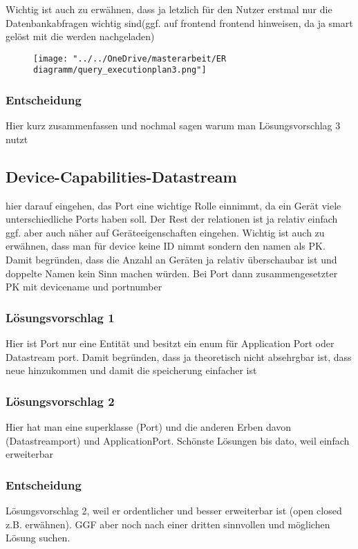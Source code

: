 Wichtig ist auch zu erwähnen, dass ja letzlich für den Nutzer erstmal nur die Datenbankabfragen wichtig sind(ggf. auf frontend frontend hinweisen, da ja smart gelöst mit die werden nachgeladen)

\begin{figure}[h]
	\centering
	\texttt{[image: "../../OneDrive/masterarbeit/ER diagramm/query\_executionplan3.png"]}
	\caption{}
	\label{fig:devicefeaturesolution3}
\end{figure}

\subsubsection{Entscheidung}
Hier kurz zusammenfassen und nochmal sagen warum man Lösungsvorschlag 3 nutzt


\subsection{Device-Capabilities-Datastream}
hier darauf eingehen, das Port eine wichtige Rolle einnimmt, da ein Gerät viele unterschiedliche Ports haben soll. Der Rest der relationen ist ja relativ einfach ggf. aber auch näher auf Geräteeigenschaften eingehen.
Wichtig ist auch zu erwähnen, dass man für device keine ID nimmt sondern den namen als PK. Damit begründen, dass die Anzahl an Geräten ja relativ überschaubar ist und doppelte Namen kein Sinn machen würden.
Bei Port dann zusammengesetzter PK mit devicename und portnumber

\subsubsection{Lösungsvorschlag 1}
Hier ist Port nur eine Entität und besitzt ein enum für Application Port oder Datastream port. Damit begründen, dass ja theoretisch nicht absehrgbar ist, dass neue hinzukommen und damit die speicherung einfacher ist


\subsubsection{Lösungsvorschlag 2}
Hier hat man eine superklasse (Port) und die anderen Erben davon (Datastreamport) und ApplicationPort. Schönste Lösungen bis dato, weil einfach erweiterbar 

\subsubsection{Entscheidung}
Lösungsvorschlag 2, weil er ordentlicher und besser erweiterbar ist (open closed z.B. erwähnen). GGF aber noch nach einer dritten sinnvollen und möglichen Lösung suchen.



